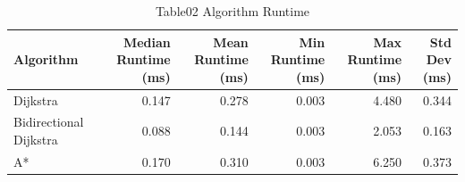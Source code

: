 \begin{table}[htbp]
\centering
\caption{Table02 Algorithm Runtime}
\begin{tabular}{lrrrrr}
\hline
Algorithm & Median Runtime (ms) & Mean Runtime (ms) & Min Runtime (ms) & Max Runtime (ms) & Std Dev (ms) \\
\hline
Dijkstra & 0.147 & 0.278 & 0.003 & 4.480 & 0.344 \\
Bidirectional Dijkstra & 0.088 & 0.144 & 0.003 & 2.053 & 0.163 \\
A* & 0.170 & 0.310 & 0.003 & 6.250 & 0.373 \\
\hline
\end{tabular}
\end{table}
